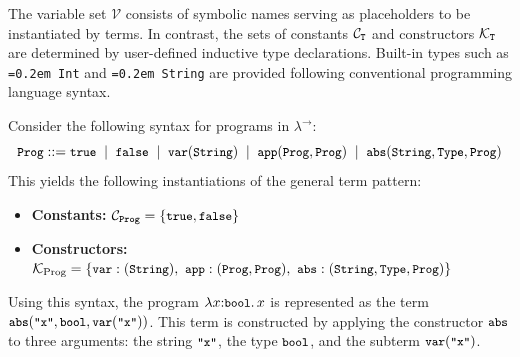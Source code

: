 \documentclass[manuscript,screen]{acmart}
\newcommand{\tcode}[1]{{\small \texttt{\spaceskip=0.2em #1}}}
\newcommand{\scode}[1]{{\fontsize{8.2pt}{\baselineskip}\tt \texttt{\spaceskip=0.15em #1}}}
\newcommand{\stlc}{\lambda^{\rightarrow}}
\begin{document}
The variable set $\mathcal{V}$ consists of symbolic names serving as placeholders to be instantiated by terms. In contrast, the sets of constants $\mathcal{C}_\scode{T}$ and constructors $\mathcal{K}_\scode{T}$ are determined by user-defined inductive type declarations. 
Built-in types such as \tcode{Int} and \tcode{String} are provided following conventional programming language syntax.

\begin{example}
Consider the following syntax for programs in $\stlc$:
\[
\tcode{Prog} ::= 
  \tcode{true} \;\mid\;
  \tcode{false} \;\mid\;
  \tcode{var}(\tcode{String}) \;\mid\;
  \tcode{app}(\tcode{Prog}, \tcode{Prog}) \;\mid\;
  \tcode{abs}(\tcode{String}, \tcode{Type}, \tcode{Prog})
\]
This yields the following instantiations of the general term pattern:
\begin{itemize}
  \item \textbf{Constants:} \(\mathcal{C}_{\tcode{Prog}} = \{\tcode{true}, \tcode{false}\}\)
  \item \textbf{Constructors:}
    \(\mathcal{K}_{\text{Prog}} = \{
      \tcode{var} : (\tcode{String}),\ 
      \tcode{app} : (\tcode{Prog}, \tcode{Prog}),\ 
      \tcode{abs} : (\tcode{String}, \tcode{Type}, \tcode{Prog})
    \}\)
\end{itemize}
Using this syntax, the program $\lambda x{:}\tcode{bool}.\, x$ is represented as the term $\tcode{abs}(\tcode{"x"}, \tcode{bool}, \tcode{var}(\tcode{"x"}))$. This term is constructed by applying the constructor $\tcode{abs}$ to three arguments: the string $\tcode{"x"}$, the type $\tcode{bool}$, and the subterm $\tcode{var}(\tcode{"x"})$.
\end{example}
\end{document}
